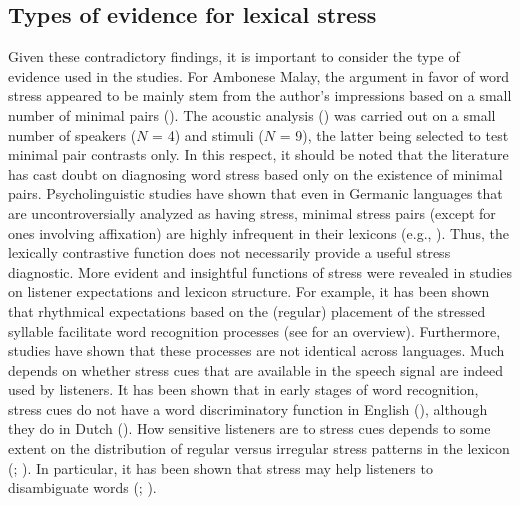 \subsection{Types of evidence for lexical stress} \label{sec412}
Given these contradictory findings, it is important to consider the type of evidence used in the studies. For Ambonese Malay, the argument in favor of word stress appeared to be mainly stem from the author's impressions based on a small number of minimal pairs (\citealt{vanminde_malayu_1997}). The acoustic analysis (\citealt{maskikit-essed_no_2016}) was carried out on a small number of speakers ($N$ = 4) and stimuli ($N$ = 9), the latter being selected to test minimal pair contrasts only. In this respect, it should be noted that the literature has cast doubt on diagnosing word stress based only on the existence of minimal pairs. Psycholinguistic studies have shown that even in Germanic languages that are uncontroversially analyzed as having stress, minimal stress pairs (except for ones involving affixation) are highly infrequent in their lexicons (e.g., \citealt{cutler_native_2012}). Thus, the lexically contrastive function does not necessarily provide a useful stress diagnostic. More evident and insightful functions of stress were revealed in studies on listener expectations and lexicon structure. For example, it has been shown that rhythmical expectations based on the (regular) placement of the stressed syllable facilitate word recognition processes (see \citealt{cutler_lexical_2005} for an overview). Furthermore, studies have shown that these processes are not identical across languages. Much depends on whether stress cues that are available in the speech signal are indeed used by listeners. It has been shown that in early stages of word recognition, stress cues do not have a word discriminatory function in English (\citealt{cutler_forbear_1986}), although they do in Dutch (\citealt{vanheuven_effects_1988}). How sensitive listeners are to stress cues depends to some extent on the distribution of regular versus irregular stress patterns in the lexicon (\citealt{domahs_stress_2012}; \citealt{peperkamp_perception_2010}). In particular, it has been shown that stress may help listeners to disambiguate words (\citealt{cutler_explaining_2006}; \citealt{cutler_phonemic_2004}).\par


